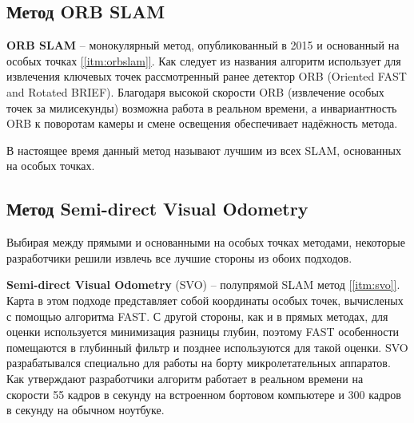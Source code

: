 \subsection{Метод ORB SLAM}
\textbf{ORB SLAM} -- монокулярный метод, опубликованный в 2015 и основанный на особых точках \hyperref[itm:orbslam]{[\ref{itm:orbslam}]}. Как следует из названия алгоритм использует для извлечения ключевых точек рассмотренный ранее детектор ORB (Oriented FAST and Rotated BRIEF). Благодаря высокой скорости ORB (извлечение особых точек за милисекунды) возможна работа в реальном времени, а инвариантность ORB к поворотам камеры и смене освещения обеспечивает надёжность метода.

В настоящее время данный метод называют лучшим из всех SLAM, основанных на особых точках.

\subsection{Метод Semi-direct Visual Odometry}
Выбирая между прямыми и основанными на особых точках методами, некоторые разработчики решили извлечь все лучшие стороны из обоих подходов.

\textbf{Semi-direct
Visual Odometry} (SVO) -- полупрямой SLAM метод \hyperref[itm:svo]{[\ref{itm:svo}]}. Карта в этом подходе представляет собой координаты особых точек, вычисленых с помощью алгоритма FAST. С другой стороны, как и в прямых методах, для оценки используется минимизация разницы глубин, поэтому FAST особенности помещаются в глубинный фильтр и позднее используются для такой оценки.
SVO разрабатывался специально для работы на борту микролетательных аппаратов. Как утверждают разработчики алгоритм работает в реальном времени на скорости 55 кадров в секунду на встроенном бортовом компьютере и 300 кадров в секунду на обычном ноутбуке.